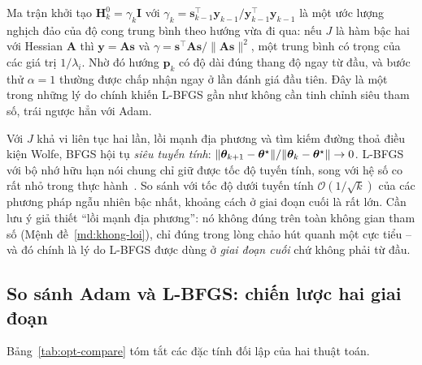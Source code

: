 \begin{nhanxet}
Ma trận khởi tạo $\bm{H}_k^{0} = \gamma_k \bm{I}$ với
$\gamma_k = \bm{s}_{k-1}^{\top}\bm{y}_{k-1} /
\bm{y}_{k-1}^{\top}\bm{y}_{k-1}$ là một ước lượng nghịch đảo của độ cong trung
bình theo hướng vừa đi qua: nếu $J$ là hàm bậc hai với Hessian $\bm{A}$ thì
$\bm{y} = \bm{A}\bm{s}$ và $\gamma = \bm{s}^{\top}\bm{A}\bm{s} /
\|\bm{A}\bm{s}\|^2$, một trung bình có trọng của các giá trị $1/\lambda_i$. Nhờ
đó hướng $\bm{p}_k$ có độ dài đúng thang độ ngay từ đầu, và bước thử
$\alpha = 1$ thường được chấp nhận ngay ở lần đánh giá đầu tiên. Đây là một trong
những lý do chính khiến L-BFGS gần như không cần tinh chỉnh siêu tham số, trái
ngược hẳn với Adam.
\end{nhanxet}
 
\begin{nhanxet}
\label{nx:toc-do}
Với $J$ khả vi liên tục hai lần, lồi mạnh địa phương và tìm kiếm đường thoả điều
kiện Wolfe, BFGS hội tụ \emph{siêu tuyến tính}:
$\|\bm{\theta}_{k+1}-\bm{\theta}^{\star}\| / \|\bm{\theta}_k - \bm{\theta}^{\star}\| \to 0$. L-BFGS với
bộ nhớ hữu hạn nói chung chỉ giữ được tốc độ tuyến tính, song với hệ số co rất
nhỏ trong thực hành~\cite{nocedal2006}. So sánh với tốc độ dưới tuyến tính
$\mathcal{O}(1/\sqrt{k})$ của các phương pháp ngẫu nhiên bậc nhất, khoảng cách ở
giai đoạn cuối là rất lớn. Cần lưu ý giả thiết ``lồi mạnh địa phương'': nó không
đúng trên toàn không gian tham số (Mệnh đề~\ref{md:khong-loi}), chỉ đúng trong
lòng chảo hút quanh một cực tiểu -- và đó chính là lý do L-BFGS được dùng ở
\emph{giai đoạn cuối} chứ không phải từ đầu.
\end{nhanxet}
 
\subsection{So sánh Adam và L-BFGS: chiến lược hai giai đoạn}
\label{subsec:adam-vs-lbfgs}
 
Bảng~\ref{tab:opt-compare} tóm tắt các đặc tính đối lập của hai thuật toán.
 

